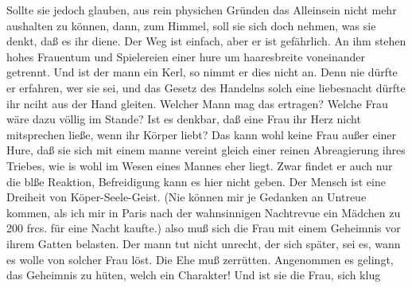 \def\day{{\color{red} [16. Mai 1944, fortgesetzt] }}
\mktitle

Sollte sie jedoch glauben, aus rein physichen Gr\"{u}nden das Alleinsein nicht mehr aushalten zu k\"{o}nnen, dann, zum Himmel, soll sie sich doch nehmen, was sie denkt, da{\ss} es ihr diene.
Der Weg ist einfach, aber er ist gef\"{a}hrlich.
An ihm stehen hohes Frauentum und Spielereien einer hure um haaresbreite voneinander getrennt.
Und ist der mann ein Kerl, so nimmt er dies nicht an.
Denn nie d\"{u}rfte er erfahren, wer sie sei, und das Gesetz des Handelns solch eine liebesnacht d\"{u}rfte ihr nciht aus der Hand gleiten.
Welcher Mann mag das ertragen?
Welche Frau w\"{a}re dazu v\"{o}llig im Stande?
Ist es denkbar, da{\ss} eine Frau ihr Herz nicht mitsprechen lie{\ss}e, wenn ihr K\"{o}rper liebt?
Das kann wohl keine Frau au{\ss}er einer Hure, da{\ss} sie sich mit einem manne vereint gleich einer reinen Abreagierung ihres Triebes, wie is wohl im Wesen eines Mannes eher liegt.
Zwar findet er auch nur die bl{\ss}e Reaktion, Befreidigung kann es hier nicht geben.
Der Mensch ist eine Dreiheit von K\"{o}per-Seele-Geist.
(Nie k\"{o}nnen mir je Gedanken an Untreue kommen, als ich mir in Paris nach der wahnsinnigen Nachtrevue ein M\"{a}dchen zu 200 frcs. f\"{u}r eine Nacht kaufte.)
also mu{\ss} sich die Frau mit einem Geheimnis vor ihrem Gatten belasten.
Der mann tut nicht unrecht, der sich sp\"{a}ter, sei es, wann es wolle von solcher Frau l\"{o}st.
Die Ehe mu{\ss} zerr\"{u}tten.
Angenommen es gelingt, das Geheimnis zu h\"{u}ten, welch ein Charakter!
Und ist sie die Frau, sich klug

\clearpage
